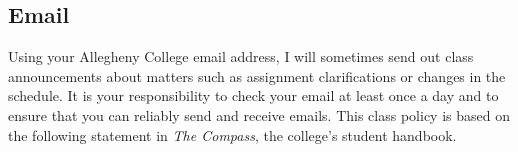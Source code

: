 % 

% 

\vspace*{-.2in}
\subsection*{Email}

Using your Allegheny College email address, I will sometimes send out class announcements about matters such as
assignment clarifications or changes in the schedule. It is your responsibility to check your email at least once a day
and to ensure that you can reliably send and receive emails. This class policy is based on the following statement in
{\em The Compass}, the college's student handbook.

